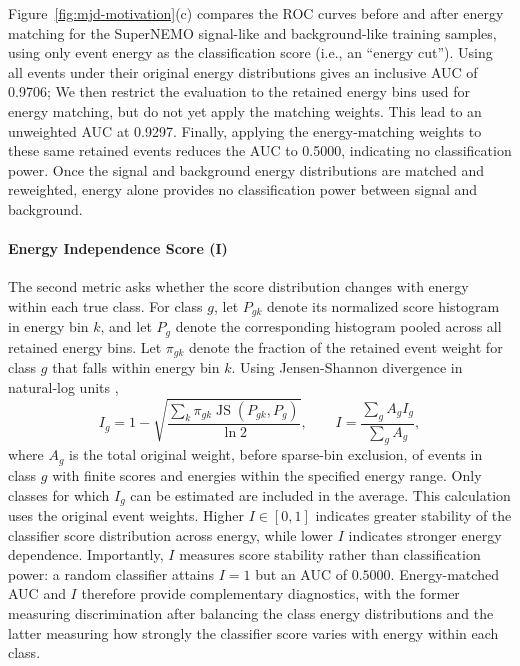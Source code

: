 Figure~\ref{fig:mjd-motivation}(c) compares the ROC curves before and after energy matching for the SuperNEMO signal-like and background-like training samples, using only event energy as the classification score (i.e., an ``energy cut''). Using all events under their original energy distributions gives an inclusive AUC of 0.9706; We then restrict the evaluation to the retained energy bins used for energy matching, but do not yet apply the matching weights. This lead to an unweighted AUC at 0.9297. Finally, applying the energy-matching weights to these same retained events reduces the AUC to 0.5000, indicating no classification power. Once the signal and background energy distributions are matched and reweighted, energy alone provides no classification power between signal and background.


\paragraph{Energy Independence Score (I)}
The second metric asks whether the score distribution changes with energy
within each true class. For class $g$, let $P_{gk}$ denote its normalized score histogram in energy bin $k$, and let $P_g$ denote the corresponding histogram pooled across all retained energy bins.
Let $\pi_{gk}$ denote the fraction of the retained event weight for class $g$ that falls within energy bin $k$. Using
Jensen-Shannon divergence in natural-log units \citep{lin1991divergence},
\begin{equation}
 I_g=1-\sqrt{\frac{\sum_k\pi_{gk}\operatorname{JS}(P_{gk},P_g)}{\ln 2}},
 \qquad I=\frac{\sum_g A_g I_g}{\sum_g A_g},
\end{equation}
where $A_g$ is the total original weight, before sparse-bin exclusion, of events in class $g$ with finite scores and energies within the specified energy range. Only classes for which $I_g$ can be estimated are included in the average. This calculation uses the original event weights. Higher $I\in[0,1]$ indicates greater stability of the classifier score distribution across energy, while lower $I$ indicates stronger energy dependence. Importantly, $I$ measures score stability rather than classification power: a random classifier attains $I=1$ but an AUC of $0.5000$. Energy-matched AUC and $I$ therefore provide complementary diagnostics, with the former measuring discrimination after balancing the class energy distributions and the latter measuring how strongly the classifier score varies with energy within each class.

